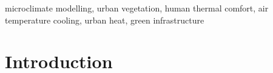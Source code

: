 \documentclass[final,3p,times,authoryear]{elsarticle}
\begin{document}
\begin{frontmatter}
\begin{abstract}
\end{abstract}


\begin{keyword}
microclimate modelling, urban vegetation, human thermal comfort, air temperature cooling, urban heat, green infrastructure



\end{keyword}

\end{frontmatter}








\section{Introduction}\label{sec:introduction}


\end{document}
